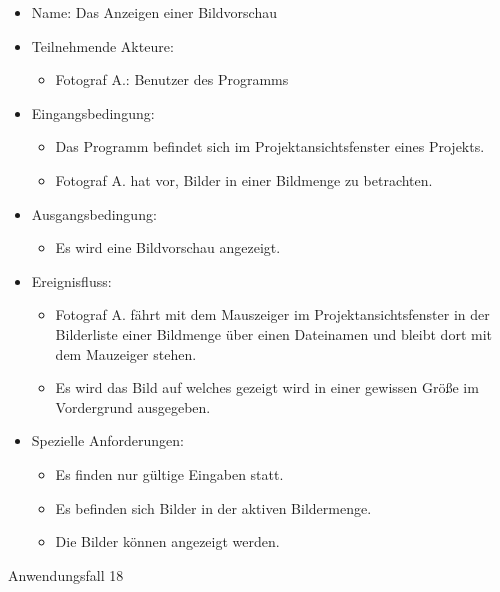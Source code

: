 \begin{itemize}
	\begin{itemize}
		\item Name: Das Anzeigen einer Bildvorschau
		\item Teilnehmende Akteure:
		\begin{itemize}
			\item	Fotograf A.: Benutzer des Programms		
		\end{itemize}
		\item Eingangsbedingung:
		\begin{itemize}
			\item	Das Programm befindet sich im Projektansichtsfenster eines Projekts.
			\item Fotograf A. hat vor, Bilder in einer Bildmenge zu betrachten.
		\end{itemize}
		\item Ausgangsbedingung:
		\begin{itemize}
			\item	Es wird eine Bildvorschau angezeigt.	
		\end{itemize}
		\item Ereignisfluss:
		\begin{itemize}
			\item Fotograf A. fährt mit dem Mauszeiger im Projektansichtsfenster in der Bilderliste einer Bildmenge über einen Dateinamen und bleibt dort mit dem Mauzeiger stehen.
			\item Es wird das Bild auf welches gezeigt wird in einer gewissen Größe im Vordergrund ausgegeben.
		\end{itemize}
		\item Spezielle Anforderungen:
		\begin{itemize}
			\item	Es finden nur gültige Eingaben statt.
			\item Es befinden sich Bilder in der aktiven Bildermenge.
			\item Die Bilder können angezeigt werden.			
		\end{itemize}			
	\end{itemize}
	
	\begin{description}
		\item[Anwendungsfall 18]
	\end{description}
	

\end{itemize}
